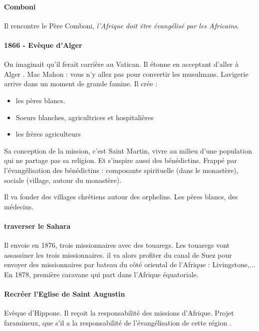 \paragraph{Comboni} Il rencontre le Père Comboni, \textit{l'Afrique doit être évangélisé par les Africains}. 

\paragraph{1866 - Evèque d'Alger} On imaginait qu'il ferait carrière au Vatican. Il étonne en acceptant d'aller à Alger . Mac Mahon : vous n'y allez pas pour convertir les musulmans.
Lavigerie arrive dans un moment de grande famine. Il crée  :
\begin{itemize}
    \item les pères blancs.
    \item Soeurs blanches, agricultrices et hospitalières
    \item les frères agriculteurs
\end{itemize}

Sa conception de la mission, c'est Saint Martin, vivre au milieu d'une population qui ne partage pas sa religion. Et s'inspire aussi des bénédictins. Frappé par l'évangélisation des bénédictins : composante spirituelle (dans le monastère), sociale (village, autour du monastère). 

Il va fonder des villages chrétiens autour des orphelins. Les pères blancs, des médecins.

\paragraph{traverser le Sahara} Il envoie en 1876, trois missionnaires avec des touaregs. Les touaregs vont assassiner les trois missionnaires. il va alors profiter du canal de Suez pour envoyer des missionnaires par bateau du côté oriental de l'Afrique : Livingstone,...
En 1878, première caravane qui part dans l'Afrique équatoriale. 

\paragraph{Recréer l'Eglise de Saint Augustin} Evèque d'Hippone. Il reçoit la responsabilité des missions d'Afrique. Projet faramineux, que s'il a la responsabilité de l'évangélisation de cette région .

